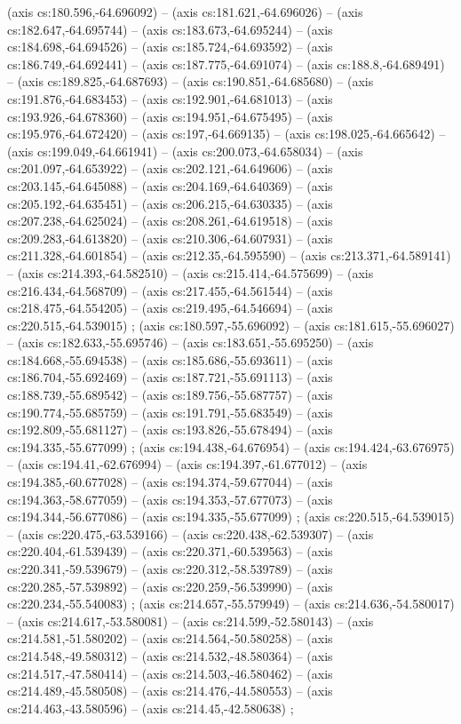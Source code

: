     (axis cs:180.596,-64.696092) --  (axis cs:181.621,-64.696026) --  (axis cs:182.647,-64.695744) --  (axis cs:183.673,-64.695244) --  (axis cs:184.698,-64.694526) --  (axis cs:185.724,-64.693592) --  (axis cs:186.749,-64.692441) --  (axis cs:187.775,-64.691074) --  (axis cs:188.8,-64.689491) --  (axis cs:189.825,-64.687693) --  (axis cs:190.851,-64.685680) --  (axis cs:191.876,-64.683453) --  (axis cs:192.901,-64.681013) --  (axis cs:193.926,-64.678360) --  (axis cs:194.951,-64.675495) --  (axis cs:195.976,-64.672420) --  (axis cs:197,-64.669135) --  (axis cs:198.025,-64.665642) --  (axis cs:199.049,-64.661941) --  (axis cs:200.073,-64.658034) --  (axis cs:201.097,-64.653922) --  (axis cs:202.121,-64.649606) --  (axis cs:203.145,-64.645088) --  (axis cs:204.169,-64.640369) --  (axis cs:205.192,-64.635451) --  (axis cs:206.215,-64.630335) --  (axis cs:207.238,-64.625024) --  (axis cs:208.261,-64.619518) --  (axis cs:209.283,-64.613820) --  (axis cs:210.306,-64.607931) --  (axis cs:211.328,-64.601854) --  (axis cs:212.35,-64.595590) --  (axis cs:213.371,-64.589141) --  (axis cs:214.393,-64.582510) --  (axis cs:215.414,-64.575699) --  (axis cs:216.434,-64.568709) --  (axis cs:217.455,-64.561544) --  (axis cs:218.475,-64.554205) --  (axis cs:219.495,-64.546694) --  (axis cs:220.515,-64.539015) ;
    (axis cs:180.597,-55.696092) --  (axis cs:181.615,-55.696027) --  (axis cs:182.633,-55.695746) --  (axis cs:183.651,-55.695250) --  (axis cs:184.668,-55.694538) --  (axis cs:185.686,-55.693611) --  (axis cs:186.704,-55.692469) --  (axis cs:187.721,-55.691113) --  (axis cs:188.739,-55.689542) --  (axis cs:189.756,-55.687757) --  (axis cs:190.774,-55.685759) --  (axis cs:191.791,-55.683549) --  (axis cs:192.809,-55.681127) --  (axis cs:193.826,-55.678494) --  (axis cs:194.335,-55.677099) ;
    (axis cs:194.438,-64.676954) --  (axis cs:194.424,-63.676975) --  (axis cs:194.41,-62.676994) --  (axis cs:194.397,-61.677012) --  (axis cs:194.385,-60.677028) --  (axis cs:194.374,-59.677044) --  (axis cs:194.363,-58.677059) --  (axis cs:194.353,-57.677073) --  (axis cs:194.344,-56.677086) --  (axis cs:194.335,-55.677099) ;
    (axis cs:220.515,-64.539015) --  (axis cs:220.475,-63.539166) --  (axis cs:220.438,-62.539307) --  (axis cs:220.404,-61.539439) --  (axis cs:220.371,-60.539563) --  (axis cs:220.341,-59.539679) --  (axis cs:220.312,-58.539789) --  (axis cs:220.285,-57.539892) --  (axis cs:220.259,-56.539990) --  (axis cs:220.234,-55.540083) ;
    (axis cs:214.657,-55.579949) --  (axis cs:214.636,-54.580017) --  (axis cs:214.617,-53.580081) --  (axis cs:214.599,-52.580143) --  (axis cs:214.581,-51.580202) --  (axis cs:214.564,-50.580258) --  (axis cs:214.548,-49.580312) --  (axis cs:214.532,-48.580364) --  (axis cs:214.517,-47.580414) --  (axis cs:214.503,-46.580462) --  (axis cs:214.489,-45.580508) --  (axis cs:214.476,-44.580553) --  (axis cs:214.463,-43.580596) --  (axis cs:214.45,-42.580638) ;
